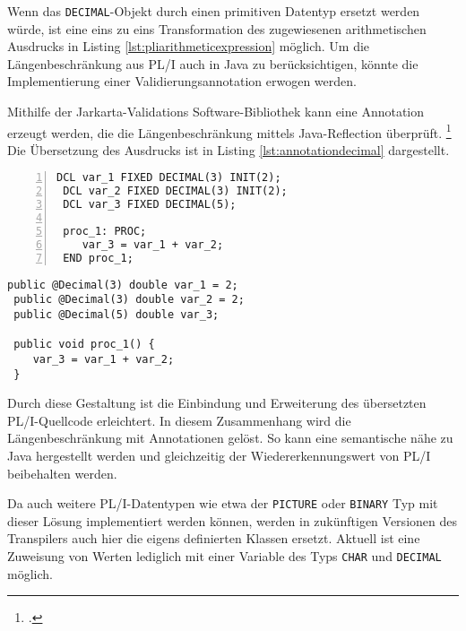 Wenn das \verb+DECIMAL+-Objekt durch einen primitiven Datentyp ersetzt werden würde, ist eine eins zu eins Transformation des zugewiesenen arithmetischen Ausdrucks in Listing \ref{lst:pliarithmeticexpression} möglich. Um die Längenbeschränkung aus PL/I auch in Java zu berücksichtigen, könnte die Implementierung einer Validierungsannotation erwogen werden.

Mithilfe der Jarkarta-Validations Software-Bibliothek kann eine Annotation erzeugt werden, die die Längenbeschränkung mittels Java-Reflection überprüft. \footcite[Vgl. ][]{jakarta}
Die Übersetzung des Ausdrucks ist in Listing \ref{lst:annotationdecimal} dargestellt.

\begin{minipage}[b]{0.48\linewidth}
	\centering
	\lstset{language=PL/I,label=SliceExaple}
	\begin{lstlisting}[frame=single, numbers=left, mathescape,%
		caption={Annotationslösung}, label={lst:annotationdecimal},
		basicstyle=\fontsize{9}{13}\selectfont\ttfamily]
 DCL var_1 FIXED DECIMAL(3) INIT(2);
 DCL var_2 FIXED DECIMAL(3) INIT(2);
 DCL var_3 FIXED DECIMAL(5);
		
 proc_1: PROC;
	var_3 = var_1 + var_2;
 END proc_1;
	\end{lstlisting}
\end{minipage}
\hspace{0.5cm}
\begin{minipage}[b]{0.48\linewidth}
	\centering
	\lstset{language=Java,label=SliceExaple}
	\begin{lstlisting}[frame=single, mathescape,%
		title={" "},
		basicstyle=\fontsize{9}{13}\selectfont\ttfamily]
 public @Decimal(3) double var_1 = 2;
 public @Decimal(3) double var_2 = 2;
 public @Decimal(5) double var_3;
		
 public void proc_1() {
 	var_3 = var_1 + var_2;
 }
	\end{lstlisting}
\end{minipage}

Durch diese Gestaltung ist die Einbindung und Erweiterung des übersetzten PL/I-Quellcode erleichtert. In diesem Zusammenhang wird die Längenbeschränkung mit Annotationen gelöst. 
So kann eine semantische nähe zu Java hergestellt werden und gleichzeitig der Wiedererkennungswert von PL/I beibehalten werden.

Da auch weitere PL/I-Datentypen wie etwa der \verb+PICTURE+ oder \verb+BINARY+ Typ mit dieser Lösung implementiert werden können, werden in zukünftigen Versionen des Transpilers auch hier die eigens definierten Klassen ersetzt.
Aktuell ist eine Zuweisung von Werten lediglich mit einer Variable des Typs \verb+CHAR+ und \verb+DECIMAL+ möglich.

